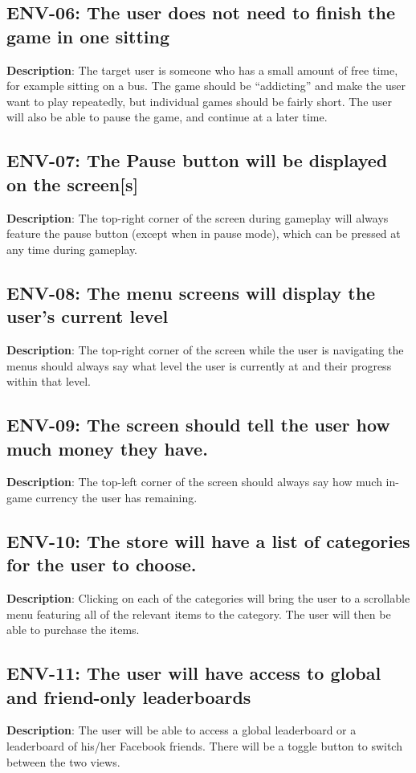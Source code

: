 \subsection{ENV-06: The user does not need to finish the game in one sitting}
\textbf{Description}: The target user is someone who has a small amount of
free time, for example sitting on a bus. The game should be \textquotedblleft{}addicting\textquotedblright{}
and make the user want to play repeatedly, but individual games should
be fairly short. The user will also be able to pause the game, and
continue at a later time.

\subsection{ENV-07: The Pause button will be displayed on the screen{[}s{]}}
\textbf{Description}: The top-right corner of the screen during gameplay will
always feature the pause button (except when in pause mode), which
can be pressed at any time during gameplay.

\subsection{ENV-08: The menu screens will display the user\textquoteright{}s
current level}
\textbf{Description}: The top-right corner of the screen while the user is
navigating the menus should always say what level the user is currently
at and their progress within that level.

\subsection{ENV-09: The screen should tell the user how much money they have.}
\textbf{Description}: The top-left corner of the screen should always say how
much in-game currency the user has remaining.

\subsection{ENV-10: The store will have a list of categories for the user to
choose. }
\textbf{Description}: Clicking on each of the categories will bring the user
to a scrollable menu featuring all of the relevant items to the category.
The user will then be able to purchase the items. 

\subsection{ENV-11: The user will have access to global and friend-only leaderboards}
\textbf{Description}: The user will be able to access a global leaderboard
or a leaderboard of his/her Facebook friends. There will be a toggle
button to switch between the two views.

